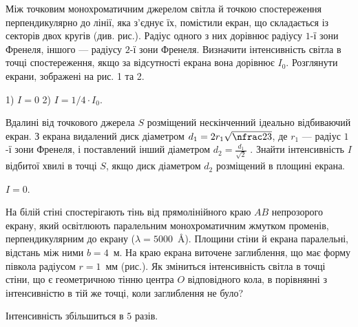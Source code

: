 \begin{problem}%
    Між точковим монохроматичним джерелом світла й точкою спостереження перпендикулярно до лінії, яка з'єднує їх, помістили екран, що складається із секторів двох кругів (див. рис.). Радіус одного з них дорівнює радіусу $1$-ї зони Френеля, іншого --- радіусу $2$-ї зони Френеля. Визначити інтенсивність світла в точці спостереження, якщо за відсутності екрана вона дорівнює $I_0$. Розглянути екрани, зображені на рис. 1 та 2.

    \begin{center}
        
    \end{center}
    \begin{solution}
        1) $ I = 0 $ 2) $ I = 1/4\cdot I_0 $.
    \end{solution}
\end{problem}



\begin{problem}%
    Вдалині від точкового джерела $S$ розміщений нескінченний ідеально відбиваючий екран. З екрана видалений диск діаметром $d_1 = 2r_1\sqrt{\nfrac23}$, де $r_1$ --- радіус $1$-ї зони Френеля, і поставлений інший діаметром $d_2 = \frac{d_1}{\sqrt2}$ . Знайти інтенсивність $I$ відбитої хвилі в точці $S$, якщо диск діаметром $d_2$ розміщений в площині екрана.
    \begin{solution}
        $ I = 0 $.
    \end{solution}
\end{problem}


\begin{problem}%
    На білій стіні спостерігають тінь від прямолінійного краю $AB$
    непрозорого екрану, який освітлюють паралельним монохроматичним
    жмутком променів, перпендикулярним до екрану ($\lambda = 5000$~\AA).
    Площини стіни й екрана паралельні, відстань між ними $b = 4$~м. На краю
    екрана виточене заглиблення, що має форму півкола радіусом $r = 1$~мм
    (рис.). Як зміниться інтенсивність світла в точці стіни, що є
    геометричною тінню центра $O$ відповідного кола, в порівнянні з
    інтенсивністю в тій же точці, коли заглиблення не було?

    \begin{center}
        
    \end{center}

    \begin{solution}
        Інтенсивність збільшиться в $ 5 $ разів.
    \end{solution}
\end{problem}



